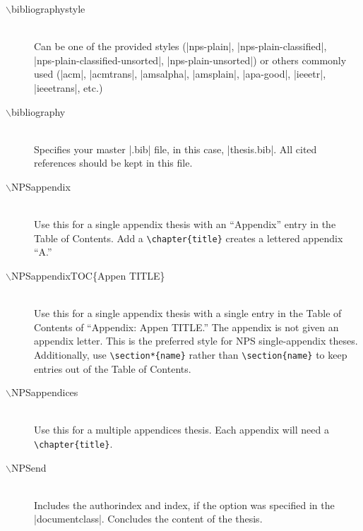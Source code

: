 \begin{description}
  \item[$\backslash$bibliographystyle] \hfill \\ Can be one of the
    provided styles (|nps-plain|, |nps-plain-classified|,\\
    |nps-plain-classified-unsorted|, |nps-plain-unsorted|) or others
    commonly used (|acm|, |acmtrans|, |amsalpha|, |amsplain|,
    |apa-good|, |ieeetr|, |ieeetrans|, etc.)
  \item[$\backslash$bibliography] \hfill \\
  Specifies your master |.bib| file, in this case, |thesis.bib|.  All cited references should be kept in this file.
  \item[$\backslash$NPSappendix] \hfill \\
  Use this for a single appendix thesis with an ``Appendix'' entry in the Table of Contents.
  Add a \verb|\chapter{title}| creates a lettered appendix ``A.'' 
  \item[$\backslash$NPSappendixTOC\{Appen TITLE\}] \hfill \\
  Use this for a single appendix thesis with a single entry in the Table of Contents of ``Appendix: Appen TITLE.''
  The appendix is not given an appendix letter.  This is the preferred style for NPS single-appendix theses.
  Additionally, use \verb|\section*{name}| rather than \verb|\section{name}| to keep entries out of the Table of Contents.
  \item[$\backslash$NPSappendices] \hfill \\
  Use this for a multiple appendices thesis.  Each appendix will need a \verb|\chapter{title}|.
  \item[$\backslash$NPSend] \hfill \\
  Includes the authorindex and index, if the option was specified in the |documentclass|.  Concludes the content of the thesis.
\end{description}

